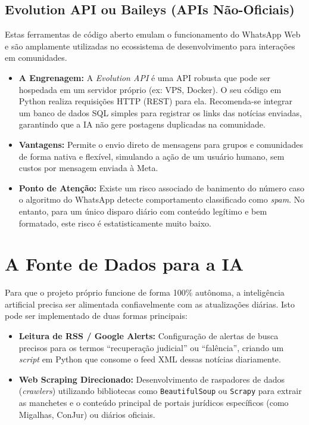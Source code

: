\documentclass[11pt,a4paper]{article}
\begin{document}
\subsection{Evolution API ou Baileys (APIs Não-Oficiais)}
Estas ferramentas de código aberto emulam o funcionamento do WhatsApp Web e são amplamente utilizadas no ecossistema de desenvolvimento para interações em comunidades.
\begin{itemize}[label=\textbullet]
    \item \textbf{A Engrenagem:} A \textit{Evolution API} é uma API robusta que pode ser hospedada em um servidor próprio (ex: VPS, Docker). O seu código em Python realiza requisições HTTP (REST) para ela. Recomenda-se integrar um banco de dados SQL simples para registrar os links das notícias enviadas, garantindo que a IA não gere postagens duplicadas na comunidade.
    \item \textbf{Vantagens:} Permite o envio direto de mensagens para grupos e comunidades de forma nativa e flexível, simulando a ação de um usuário humano, sem custos por mensagem enviada à Meta.
    \item \textbf{Ponto de Atenção:} Existe um risco associado de banimento do número caso o algoritmo do WhatsApp detecte comportamento classificado como \textit{spam}. No entanto, para um único disparo diário com conteúdo legítimo e bem formatado, este risco é estatisticamente muito baixo.
\end{itemize}

\section{A Fonte de Dados para a IA}
Para que o projeto próprio funcione de forma 100\% autônoma, a inteligência artificial precisa ser alimentada confiavelmente com as atualizações diárias. Isto pode ser implementado de duas formas principais:
\begin{itemize}[label=\textbullet]
    \item \textbf{Leitura de RSS / Google Alerts:} Configuração de alertas de busca precisos para os termos ``recuperação judicial'' ou ``falência'', criando um \textit{script} em Python que consome o feed XML dessas notícias diariamente.
    \item \textbf{Web Scraping Direcionado:} Desenvolvimento de raspadores de dados (\textit{crawlers}) utilizando bibliotecas como \texttt{BeautifulSoup} ou \texttt{Scrapy} para extrair as manchetes e o conteúdo principal de portais jurídicos específicos (como Migalhas, ConJur) ou diários oficiais.
\end{itemize}
\end{document}
